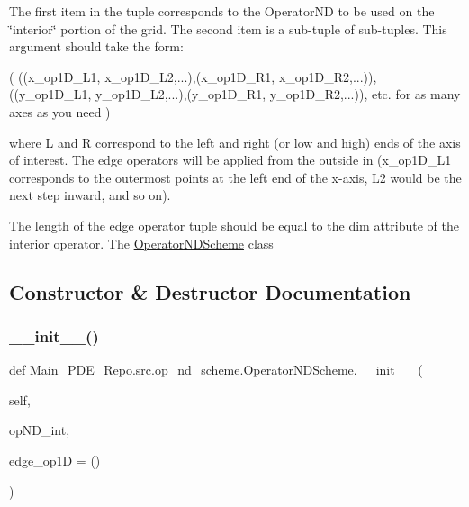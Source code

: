 The first item in the tuple corresponds to the Operator\+ND to be used on the \char`\"{}interior\char`\"{} portion of the grid. The second item is a sub-\/tuple of sub-\/tuples. This argument should take the form\+:

( ((x\+\_\+op1\+D\+\_\+\+L1, x\+\_\+op1\+D\+\_\+\+L2,...),(x\+\_\+op1\+D\+\_\+\+R1, x\+\_\+op1\+D\+\_\+\+R2,...)), ((y\+\_\+op1\+D\+\_\+\+L1, y\+\_\+op1\+D\+\_\+\+L2,...),(y\+\_\+op1\+D\+\_\+\+R1, y\+\_\+op1\+D\+\_\+\+R2,...)), etc. for as many axes as you need )

where L and R correspond to the left and right (or low and high) ends of the axis of interest. The edge operators will be applied from the outside in (x\+\_\+op1\+D\+\_\+\+L1 corresponds to the outermost points at the left end of the x-\/axis, L2 would be the next step inward, and so on).

The length of the edge operator tuple should be equal to the dim attribute of the interior operator. The \hyperlink{classMain__PDE__Repo_1_1src_1_1op__nd__scheme_1_1OperatorNDScheme}{Operator\+N\+D\+Scheme} class 

\subsection{Constructor \& Destructor Documentation}
\mbox{\label{classMain__PDE__Repo_1_1src_1_1op__nd__scheme_1_1OperatorNDScheme_ac4dbbc0240cc4c65f01c481376a352f2}} 
\subsubsection{\texorpdfstring{\+\_\+\+\_\+init\+\_\+\+\_\+()}{\_\_init\_\_()}}
{\footnotesize\ttfamily def Main\+\_\+\+P\+D\+E\+\_\+\+Repo.\+src.\+op\+\_\+nd\+\_\+scheme.\+Operator\+N\+D\+Scheme.\+\_\+\+\_\+init\+\_\+\+\_\+ (\begin{DoxyParamCaption}\item[{}]{self,  }\item[{}]{op\+N\+D\+\_\+int,  }\item[{}]{edge\+\_\+op1D = {\ttfamily ()} }\end{DoxyParamCaption})}



